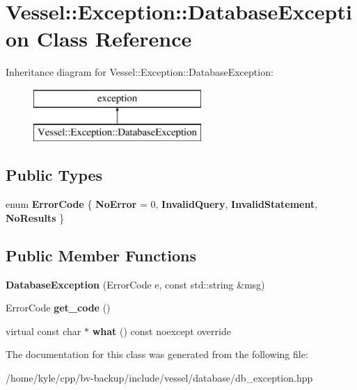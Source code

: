 \hypertarget{class_vessel_1_1_exception_1_1_database_exception}{}\section{Vessel\+:\+:Exception\+:\+:Database\+Exception Class Reference}
\label{class_vessel_1_1_exception_1_1_database_exception}
Inheritance diagram for Vessel\+:\+:Exception\+:\+:Database\+Exception\+:\begin{figure}[H]
\begin{center}
\leavevmode
\includegraphics[height=2.000000cm]{class_vessel_1_1_exception_1_1_database_exception}
\end{center}
\end{figure}
\subsection*{Public Types}
\begin{DoxyCompactItemize}
\item 
\mbox{\label{class_vessel_1_1_exception_1_1_database_exception_ab135bfa02ded1e5a862e2f3299128d37}} 
enum {\bfseries Error\+Code} \{ {\bfseries No\+Error} = 0, 
{\bfseries Invalid\+Query}, 
{\bfseries Invalid\+Statement}, 
{\bfseries No\+Results}
 \}
\end{DoxyCompactItemize}
\subsection*{Public Member Functions}
\begin{DoxyCompactItemize}
\item 
\mbox{\label{class_vessel_1_1_exception_1_1_database_exception_ac9328d758ce098b81a744bab973eb945}} 
{\bfseries Database\+Exception} (Error\+Code e, const std\+::string \&msg)
\item 
\mbox{\label{class_vessel_1_1_exception_1_1_database_exception_ab38886bc94c9d0e00dc932601db7a1f1}} 
Error\+Code {\bfseries get\+\_\+code} ()
\item 
\mbox{\label{class_vessel_1_1_exception_1_1_database_exception_ad9102ff132bec42ebd89117178bd6614}} 
virtual const char $\ast$ {\bfseries what} () const noexcept override
\end{DoxyCompactItemize}


The documentation for this class was generated from the following file\+:\begin{DoxyCompactItemize}
\item 
/home/kyle/cpp/bv-\/backup/include/vessel/database/db\+\_\+exception.\+hpp\end{DoxyCompactItemize}
